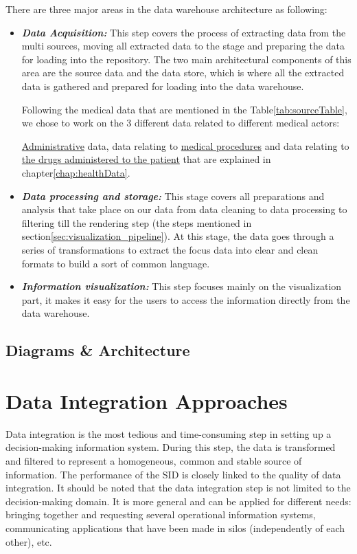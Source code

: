 There are three major areas in the data warehouse architecture as following:
\begin{itemize}
  \item \textbf{\textit{Data Acquisition:}} This step covers the process of extracting data from the multi sources, moving all extracted data to the stage and preparing the data for loading into the repository. The two main architectural components of this area are the source data and the data store, which is where all the extracted data is gathered and prepared for loading into the data warehouse.
  
  Following the medical data that are mentioned in the Table\ref{tab:sourceTable}, we chose to work on  the 3 different data related to different medical actors:
  
  \underline{Administrative} data, data relating to \underline{medical procedures} and data relating to \underline{the drugs administered to the patient} that are explained in chapter\ref{chap:healthData}.
  \item \textbf{\textit{Data processing and storage:}} This stage covers all preparations and analysis that take place on our data from data cleaning to data processing to filtering till the rendering step (the steps mentioned in section\ref{sec:visualization_pipeline}).
  At this stage, the data goes through a series of transformations to extract the focus data into clear and clean formats to build a sort of common language.

  \item \textbf{\textit{Information visualization:}} This step focuses mainly on the visualization part, it makes it easy for the users to access the information directly from the data warehouse.
\end{itemize}

\subsection{Diagrams \& Architecture}
\section{Data Integration Approaches} 
Data integration is the most tedious and time-consuming step in setting up a decision-making information system. During this step, the data is transformed and filtered to represent a homogeneous, common and stable source of information. The performance of the SID is closely linked to the quality of data integration. It should be noted that the data integration step is not limited to the decision-making domain. It is more general and can be applied for different needs: bringing together and requesting several operational information systems, communicating applications that have been made in silos (independently of each other), etc.
 
